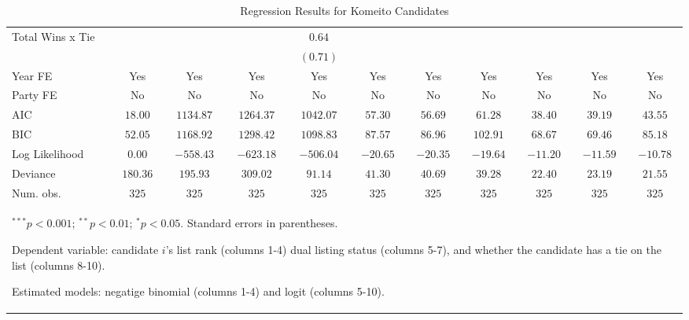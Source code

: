 \begin{table}
\begin{center}
\begin{tabular}{l c c c c c c c c c c}
Total Wins x Tie &               &               &           & $0.64$        &          &          &          &          &          &          \\
                 &               &               &           & $(0.71)$      &          &          &          &          &          &          \\
\hline
Year FE          & Yes           & Yes           & Yes       & Yes           & Yes      & Yes      & Yes      & Yes      & Yes      & Yes      \\
Party FE         & No            & No            & No        & No            & No       & No       & No       & No       & No       & No       \\
AIC              & $18.00$       & $1134.87$     & $1264.37$ & $1042.07$     & $57.30$  & $56.69$  & $61.28$  & $38.40$  & $39.19$  & $43.55$  \\
BIC              & $52.05$       & $1168.92$     & $1298.42$ & $1098.83$     & $87.57$  & $86.96$  & $102.91$ & $68.67$  & $69.46$  & $85.18$  \\
Log Likelihood   & $0.00$        & $-558.43$     & $-623.18$ & $-506.04$     & $-20.65$ & $-20.35$ & $-19.64$ & $-11.20$ & $-11.59$ & $-10.78$ \\
Deviance         & $180.36$      & $195.93$      & $309.02$  & $91.14$       & $41.30$  & $40.69$  & $39.28$  & $22.40$  & $23.19$  & $21.55$  \\
Num. obs.        & $325$         & $325$         & $325$     & $325$         & $325$    & $325$    & $325$    & $325$    & $325$    & $325$    \\
\hline
\multicolumn{11}{l}{\scriptsize{\item $^{***}p<0.001$; $^{**}p<0.01$; $^{*}p<0.05$. Standard errors in parentheses.
\item Dependent variable: candidate $i$'s list rank (columns 1-4) dual listing status (columns 5-7), and whether the candidate has a tie on the list (columns 8-10).
\item Estimated models: negatige binomial (columns 1-4) and logit (columns 5-10).}}
\end{tabular}
\caption{Regression Results for Komeito Candidates}
\label{tab:komeito}
\end{center}
\end{table}

